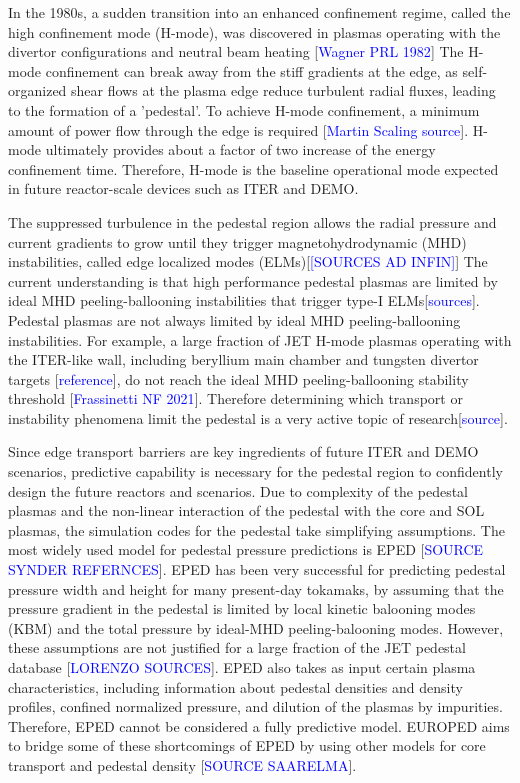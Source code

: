 \documentclass[a4paper, twoside, final, 12pt]{article}
\begin{document}
In the 1980s, a sudden transition into an enhanced confinement regime, called the high confinement mode (H-mode), was discovered in plasmas operating with the divertor configurations and neutral beam heating [\textcolor{blue}{Wagner PRL 1982}]
The H-mode confinement can break away from the stiff gradients at the edge, as self-organized shear flows at the plasma edge reduce turbulent radial fluxes, leading to the formation of a 'pedestal'.
To achieve H-mode confinement, a minimum amount of power flow through the edge is required [\textcolor{blue}{Martin Scaling source}]. H-mode ultimately provides about a factor of two increase of the energy confinement time. Therefore, H-mode is the baseline operational mode expected in future reactor-scale devices such as ITER and DEMO.

The suppressed turbulence in the pedestal region allows the radial pressure  and current gradients to grow until they trigger magnetohydrodynamic (MHD) instabilities, called edge localized modes (ELMs)[\textcolor{blue}{[SOURCES AD INFIN]}]
The current understanding is that high performance pedestal plasmas are limited by ideal MHD peeling-ballooning instabilities that trigger type-I ELMs[\textcolor{blue}{sources}].
Pedestal plasmas are not always limited by ideal MHD peeling-ballooning instabilities.
For example, a large fraction of JET H-mode plasmas operating with the ITER-like wall, including beryllium main chamber and tungsten divertor targets [\textcolor{blue}{reference}], do not reach the ideal MHD peeling-ballooning stability threshold [\textcolor{blue}{Frassinetti NF 2021}].  Therefore determining which transport or instability phenomena limit the pedestal is a very active topic of research[\textcolor{blue}{source}].

Since edge transport barriers are key ingredients of future ITER and DEMO scenarios, predictive capability is necessary for the pedestal region to confidently design the future reactors and scenarios.
Due to complexity of the pedestal plasmas and the non-linear interaction of the pedestal with the core and SOL plasmas, the simulation codes for the pedestal take simplifying assumptions. The most widely used model for pedestal pressure predictions is EPED [\textcolor{blue}{SOURCE SYNDER REFERNCES}]. 
EPED has been very successful for predicting pedestal pressure width and height for many present-day tokamaks, by assuming that the pressure gradient in the pedestal is limited by local kinetic balooning modes (KBM) and the total pressure by ideal-MHD peeling-balooning modes. However, these assumptions are not justified for a large fraction of the JET pedestal database [\textcolor{blue}{LORENZO SOURCES}]. EPED also takes as input certain plasma characteristics, including information about pedestal densities and density profiles, confined normalized pressure, and dilution of the plasmas by impurities. Therefore, EPED cannot be considered a fully predictive model. EUROPED aims to bridge some of these shortcomings of EPED by using other models for core transport and pedestal density [\textcolor{blue}{SOURCE SAARELMA}]. 
\end{document}

